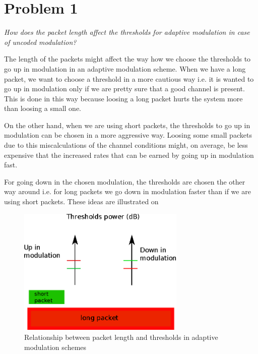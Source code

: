 \section{Problem 1} \label{sec:mm5_Pb1}
\textit{How does the packet length affect the thresholds for adaptive modulation in case of uncoded modulation?}

The length of the packets might affect the way how we choose the thresholds to go up in modulation in an adaptive modulation scheme. When we have a long packet, we want to choose a threshold in a more cautious way i.e. it is wanted to go up in modulation only if we are pretty sure that a good channel is present. This is done in this way because loosing a long packet hurts the system more than loosing a small one.

On the other hand, when we are using short packets, the thresholds to go up in modulation can be chosen in a more aggressive way. Loosing some small packets due to this miscalculations of the channel conditions might, on average, be less expensive that the increased rates that can be earned by going up in modulation fast.

For going down in the chosen modulation, the thresholds are chosen the other way around i.e. for long packets we go down in modulation faster than if we are using short packets. These ideas are illustrated on 


\begin{figure}[!h]
  \centering
  \includegraphics[width=8cm]{figures/thresholds_packet_size.eps}
  \caption{Relationship between packet length and thresholds in adaptive modulation schemes}
  \label{fig:thresholds_packet_size}
\end{figure}